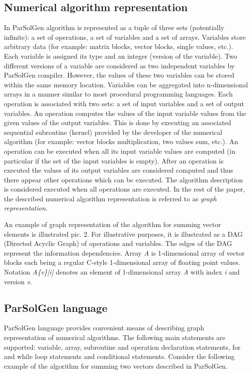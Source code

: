 \documentclass[conference]{IEEEtran}
\begin{document}
\subsection{Numerical algorithm representation}
In ParSolGen algorithm is represented as a tuple of three sets (potentially infinite): a set of operations, a set of  
variables and a set of arrays. 
Variables store arbitrary data (for example: matrix blocks, vector blocks, single values, etc.). Each variable is assigned its type and an integer (version of the variable). Two different versions of a variable 
are considered as two independent variables by ParSolGen compiler. However, the values of these two variables can 
be stored within the same memory location. Variables can be aggregated into n-dimensional arrays in a manner similar to most procedural programming languages. Each operation is associated with two sets: a set of input variables and 
a set of output variables. An operation computes the values of the input variable values from the given 
values of the output variables. This is done by executing an associated sequential subroutine (kernel) 
provided by the developer of the numerical algorithm 
(for example: vector blocks multiplication, two values sum, etc.). An operation 
can be executed when all its input variable values are computed (in particular if the set of the input variables is empty). After an operation is executed 
the values of its output variables are considered computed and thus there appear other operations which can 
be executed. The algorithm description is considered executed when all operations are executed. 
In the rest of the paper, the described numerical algorithm representation is referred to as \textit{graph representation}.

An example of graph representation of the algorithm for summing vector elements is illustrated pic. 2. For 
illustrative purposes, it is illustrated as a DAG (Directed Acyclic Graph) of operations and variables. 
The edges of the DAG represent the information dependencies.
Array \textit{A} is 1-dimensional array of vector blocks each being a regular C-style 
1-dimensional array of floating point values.
Notation \textit{A\{v\}[i]} denotes an element of 1-dimensional array \textit{A} with 
index \textit{i} and version \textit{v}.

\subsection{ParSolGen language}
ParSolGen language provides convenient means of describing graph representation of numerical algorithms.
The following main statements are supported: variable, array, subroutine and 
operation declaration statements, for and while loop statements and conditional statements.
Consider the following example of the algorithm for summing two vectors described in ParSolGen.
\end{document}
